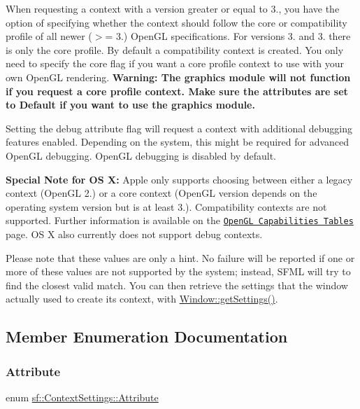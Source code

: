 When requesting a context with a version greater or equal to 3., you have the option of specifying whether the context should follow the core or compatibility profile of all newer ($>$= 3.) Open\+GL specifications. For versions 3. and 3. there is only the core profile. By default a compatibility context is created. You only need to specify the core flag if you want a core profile context to use with your own Open\+GL rendering. {\bfseries Warning\+: The graphics module will not function if you request a core profile context. Make sure the attributes are set to Default if you want to use the graphics module.}

Setting the debug attribute flag will request a context with additional debugging features enabled. Depending on the system, this might be required for advanced Open\+GL debugging. Open\+GL debugging is disabled by default.

{\bfseries Special Note for OS X\+:} Apple only supports choosing between either a legacy context (Open\+GL 2.) or a core context (Open\+GL version depends on the operating system version but is at least 3.). Compatibility contexts are not supported. Further information is available on the \href{https://developer.apple.com/opengl/capabilities/index.html}{\tt Open\+GL Capabilities Tables} page. OS X also currently does not support debug contexts.

Please note that these values are only a hint. No failure will be reported if one or more of these values are not supported by the system; instead, S\+F\+ML will try to find the closest valid match. You can then retrieve the settings that the window actually used to create its context, with \hyperlink{classsf_1_1_window_ae5b8065e92bbd0408e1fd8328e80d7d1}{Window\+::get\+Settings()}. 

\subsection{Member Enumeration Documentation}
\mbox{\label{structsf_1_1_context_settings_af2e91e57e8d26c40afe2ec8efaa32a2c}} 
\subsubsection{\texorpdfstring{Attribute}{Attribute}}
{\footnotesize\ttfamily enum \hyperlink{structsf_1_1_context_settings_af2e91e57e8d26c40afe2ec8efaa32a2c}{sf\+::\+Context\+Settings\+::\+Attribute}}



